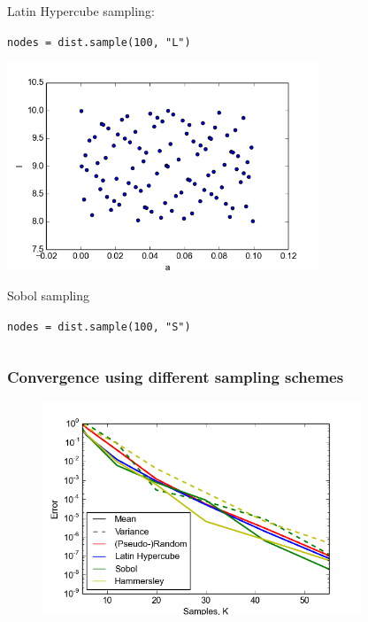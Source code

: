 \documentclass{beamer}
\begin{document}
\begin{frame}[fragile]
\begin{columns}
\begin{center}
                Latin Hypercube sampling:

                \scriptsize
                \verb;nodes = dist.sample(100, "L");
                \normalsize

     
		
                \includegraphics[width=0.7\textwidth]{samples_S.png}

                Sobol sampling

                \scriptsize
                \verb;nodes = dist.sample(100, "S");
                \normalsize
     \end{center}
 \end{columns}
\end{frame}


\begin{frame}
 \frametitle{Convergence using different sampling schemes}
  \begin{figure}
  \includegraphics[width=0.85\textwidth]{convergence_collocation_compare.png}
 \end{figure}
\end{frame}
\end{document}

